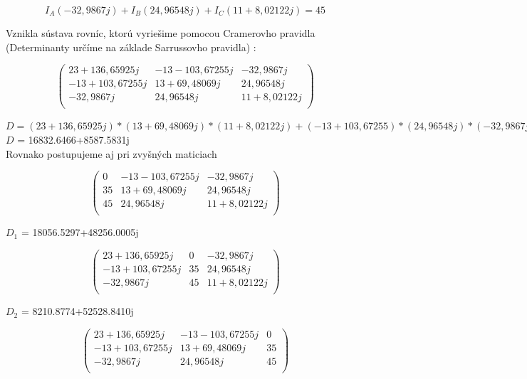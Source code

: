 \documentclass[a4paper,12pt]{article}
\begin{document}
\begin{equation*}
I_A(-32,9867j) + I_B(24,96548j) + I_C(11+8,02122j)=45
\end{equation*}

\begin{flushleft}
Vznikla sústava rovníc, ktorú vyriešime pomocou Cramerovho pravidla (Determinanty určíme na základe Sarrussovho pravidla) : 
\end{flushleft}
 
$$
\begin{pmatrix}
23+136,65925j & -13-103,67255j & -32,9867j \\
-13+103,67255j & 13+69,48069j & 24,96548j \\
-32,9867j & 24,96548j & 11+8,02122j \\
\end{pmatrix}
$$

\begin{center}
$D = (23+136,65925j)*(13+69,48069j)*(11+8,02122j)+(-13+103,67255)*(24,96548j)*(-32,9867j)+(-32,9867j)*(-13-103,67255j)*(24,96548j)-(-32,9867j)*(13+69,48069j)*(-32,9867j)-(24,96548j)*(24,96548j)*(23+136,65925j)-(11+8,02122j)*(-13-103,67255j)*(-13+103,67255j)$ \\
$D$ = 16832.6466+8587.5831j\\
Rovnako postupujeme aj pri zvyšných maticiach
\end{center}

$$
\begin{pmatrix}
0 & -13-103,67255j & -32,9867j \\
35 & 13+69,48069j & 24,96548j \\
45 & 24,96548j & 11+8,02122j \\
\end{pmatrix}
$$

\begin{center}
$D_1$ = 18056.5297+48256.0005j
\end{center}

$$
\begin{pmatrix}
23+136,65925j & 0 & -32,9867j \\
-13+103,67255j & 35 & 24,96548j \\
-32,9867j & 45 & 11+8,02122j \\
\end{pmatrix}
$$

\begin{center}
$D_2$ = 8210.8774+52528.8410j
\end{center}

$$
\begin{pmatrix}
23+136,65925j & -13-103,67255j & 0 \\
-13+103,67255j & 13+69,48069j & 35 \\
-32,9867j & 24,96548j & 45 \\
\end{pmatrix}
$$
\end{document}
